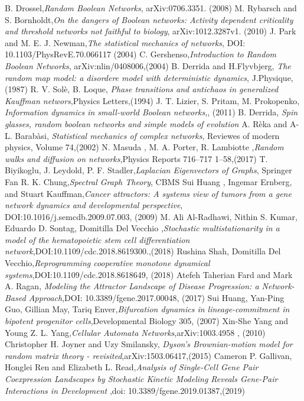 \begin{thebibliography}{90}
 B. Drossel,\emph{Random Boolean Networks}, arXiv:0706.3351. (2008)
 M. Rybarsch and S. Bornholdt,\emph{On the dangers of Boolean networks:
Activity dependent criticality and threshold networks not faithful to biology}, arXiv:1012.3287v1. (2010)
 J. Park and M. E. J. Newman,\emph{The statistical mechanics of networks}, DOI: 10.1103/PhysRevE.70.066117 (2004)
 C. Gershenso,\emph{Introduction to Random Boolean Networks}, arXiv:nlin/0408006,(2004)
 B. Derrida and H.Flyvbjerg, \emph{The random map model: a disordere model with deterministic dynamics}, J.Physique, (1987)
 R. V. Solè, B. Loque, \emph{Phase transitions and antichaos in generalized Kauffman networs},Physics Letters,(1994)
 J. T. Lizier, S. Pritam, M. Prokopenko, \emph{Information dynamics in small-world Boolean networks},, (2011)
 B. Derrida, \emph{Spin glasses, random boolean networks and simple models of evolution}
 A. Rèka and A-L. Barabàsi, \emph{Statistical mechanics of complex networks}, Reviewes of modern physics, Volume 74,(2002)
 N. Masuda , M. A. Porter, R. Lambiotte ,\emph{Random walks and diffusion on networks},Physics Reports 716–717 1–58,(2017)
 T. Biyikoglu, J. Leydold, P. F. Stadler,\emph{Laplacian Eigenvectors of Graphs}, Springer
 Fan R. K. Chung,\emph{Spectral Graph Theory}, CBMS
 Sui Huang , Ingemar Ernberg, and Stuart Kauffman,\emph{Cancer attractors: A systems view of tumors from a gene network
dynamics and developmental perspective}, DOI:10.1016/j.semcdb.2009.07.003, (2009)
 M. Ali Al-Radhawi, Nithin S. Kumar, Eduardo D. Sontag, Domitilla Del Vecchio ,\emph{Stochastic multistationarity in a model of the hematopoietic
stem cell differentiation network},DOI:10.1109/cdc.2018.8619300.,(2018)
 Rushina Shah, Domitilla Del Vecchio,\emph{Reprogramming cooperative monotone dynamical systems},DOI:10.1109/cdc.2018.8618649, (2018)
 Atefeh Taherian Fard and Mark A. Ragan, \emph{Modeling the Attractor Landscape of
Disease Progression: a
Network-Based Approach},DOI: 10.3389/fgene.2017.00048, (2017)
 Sui Huang, Yan-Ping Guo, Gillian May, Tariq Enver,\emph{Bifurcation dynamics in lineage-commitment in bipotent progenitor cells},Developmental Biology 305, (2007)
 Xin-She Yang and Young Z. L. Yang,\emph{Cellular Automata Networks},arXiv:1003.4958 , (2010)
 Christopher H. Joyner and Uzy Smilansky, \emph{Dyson’s Brownian-motion model for random matrix
theory - revisited},arXiv:1503.06417,(2015)
 Cameron P. Gallivan, Honglei Ren and Elizabeth L. Read,\emph{Analysis of Single-Cell Gene Pair
Coexpression Landscapes by
Stochastic Kinetic Modeling Reveals
Gene-Pair Interactions in
Development} ,doi: 10.3389/fgene.2019.01387,(2019)


\end{thebibliography}
